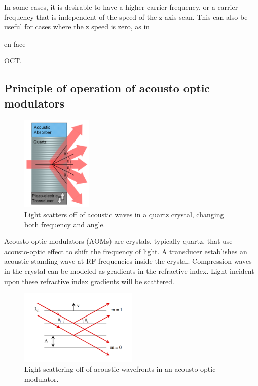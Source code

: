 In some cases, it is desirable to have a higher carrier frequency, or a carrier frequency that is independent of the speed of the z-axis scan. This can also be useful for cases where the z speed is zero, as in \begin{em}en-face\end{em} OCT. \cite{bouma} \cite{hitzenberger}

\subsection{Principle of operation of acousto optic modulators}

\begin{figure}[h!]
\centering
\includegraphics[width=0.3\textwidth]{Images/Background/aom.png}
\caption{Light scatters off of acoustic waves in a quartz crystal, changing both frequency and angle.}
\end{figure}

Acousto optic modulators (AOMs) are crystals, typically quartz, that use acousto-optic effect to shift the frequency of light. A transducer establishes an acoustic standing wave at RF frequencies inside the crystal. Compression waves in the crystal can be modeled as gradients in the refractive index. Light incident upon these refractive index gradients will be scattered. \cite{haus}

\begin{figure}[h!]
\centering
\includegraphics[width=0.5\textwidth]{Images/Background/aom_scattering.png}
\caption{Light scattering off of acoustic wavefronts in an acousto-optic modulator.}
\end{figure}

